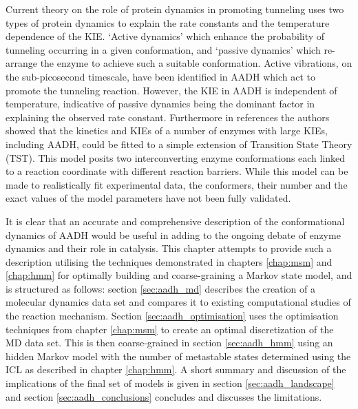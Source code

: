 Current theory on the role of protein dynamics in promoting tunneling \cite{kuznetsovProtonHydrogenAtom1999a,masgrau2004hydrogen} uses two types of protein dynamics to explain the rate constants and the temperature dependence of the KIE. `Active dynamics' which enhance the probability of tunneling occurring in a given conformation, and `passive dynamics' which re-arrange the enzyme to achieve such a suitable conformation. Active vibrations, on the sub-picosecond timescale, have been identified in AADH\cite{johannissenEnzymeAromaticAmine2008,johannissenProtonTunnelingAromatic2007} which act to promote the tunneling reaction.  However, the KIE in AADH is independent of temperature\cite{masgrauAtomicDescriptionEnzyme2006}, indicative of passive dynamics being the dominant factor in explaining the observed rate constant. Furthermore in references \cite{glowackiProteinDynamicsEnzyme2012a,glowackiTakingOckhamRazor2012b} the authors showed that the kinetics and KIEs of a number of enzymes with large KIEs, including AADH, could be fitted to a simple extension of Transition State Theory (TST). This model posits two interconverting enzyme conformations each linked to a reaction coordinate with different reaction barriers. While this model can be made to  realistically fit experimental data, the conformers, their number and the exact values of the model parameters have not been fully validated. 

It is clear that an accurate and comprehensive description of the conformational dynamics of AADH would be useful in adding to the ongoing debate of enzyme dynamics and their role in catalysis. This chapter attempts to provide such a description utilising the techniques demonstrated in chapters \ref{chap:msm} and \ref{chap:hmm} for optimally building and coarse-graining a Markov state model, and is structured as follows: section \ref{sec:aadh_md} describes the creation of a molecular dynamics data set and compares it to existing computational studies of the reaction mechanism. Section \ref{sec:aadh_optimisation} uses the optimisation techniques from chapter \ref{chap:msm} to create an optimal discretization of the MD data set. This is then coarse-grained in section \ref{sec:aadh_hmm} using an hidden Markov model with the number of metastable states determined using the ICL as described in chapter \ref{chap:hmm}. A short summary and discussion of the implications of the final set of models is given in section \ref{sec:aadh_landscape} and section \ref{sec:aadh_conclusions} concludes and discusses  the limitations. 

